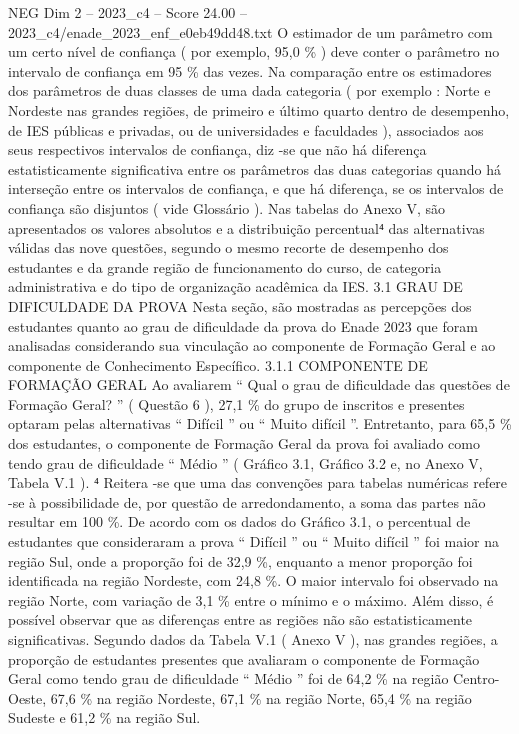 \begin{textsample}{NEG Dim 2 – 2023\_c4 – Score 24.00 – 2023\_c4/enade\_2023\_enf\_e0eb49dd48.txt}
O estimador de um parâmetro com um certo nível de confiança ( por exemplo, 95,0 \% ) deve conter o parâmetro no intervalo de confiança em 95 \% das vezes.
Na comparação entre os estimadores dos parâmetros de duas classes de uma dada categoria ( por exemplo : Norte e Nordeste nas grandes regiões, de primeiro e último quarto dentro de desempenho, de IES públicas e privadas, ou de universidades e faculdades ), associados aos seus respectivos intervalos de confiança, diz -se que não há diferença estatisticamente significativa entre os parâmetros das duas categorias quando há interseção entre os intervalos de confiança, e que há diferença, se os intervalos de confiança são disjuntos ( vide Glossário ).
Nas tabelas do Anexo V, são apresentados os valores absolutos e a distribuição percentual⁴ das alternativas válidas das nove questões, segundo o mesmo recorte de desempenho dos estudantes e da grande região de funcionamento do curso, de categoria administrativa e do tipo de organização acadêmica da IES. 3.1 GRAU DE DIFICULDADE DA PROVA Nesta seção, são mostradas as percepções dos estudantes quanto ao grau de dificuldade da prova do Enade 2023 que foram analisadas considerando sua vinculação ao componente de Formação Geral e ao componente de Conhecimento Específico. 3.1.1 COMPONENTE DE FORMAÇÃO GERAL Ao avaliarem “ Qual o grau de dificuldade das questões de Formação Geral? ” ( Questão 6 ), 27,1 \% do grupo de inscritos e presentes optaram pelas alternativas “ Difícil ” ou “ Muito difícil ”.
Entretanto, para 65,5 \% dos estudantes, o componente de Formação Geral da prova foi avaliado como tendo grau de dificuldade “ Médio ” ( Gráfico 3.1, Gráfico 3.2 e, no Anexo V, Tabela V.1 ). ⁴ Reitera -se que uma das convenções para tabelas numéricas refere -se à possibilidade de, por questão de arredondamento, a soma das partes não resultar em 100 \%.
De acordo com os dados do Gráfico 3.1, o percentual de estudantes que consideraram a prova “ Difícil ” ou “ Muito difícil ” foi maior na região Sul, onde a proporção foi de 32,9 \%, enquanto a menor proporção foi identificada na região Nordeste, com 24,8 \%.
O maior intervalo foi observado na região Norte, com variação de 3,1 \% entre o mínimo e o máximo.
Além disso, é possível observar que as diferenças entre as regiões não são estatisticamente significativas.
Segundo dados da Tabela V.1 ( Anexo V ), nas grandes regiões, a proporção de estudantes presentes que avaliaram o componente de Formação Geral como tendo grau de dificuldade “ Médio ” foi de 64,2 \% na região Centro-Oeste, 67,6 \% na região Nordeste, 67,1 \% na região Norte, 65,4 \% na região Sudeste e 61,2 \% na região Sul.

\end{textsample}
